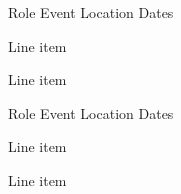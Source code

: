 

\begin{cventries}

  \cventry
    {Role} %
    {Event} %
    {Location} %
    {Dates} %
    {
      \begin{cvitems} %
        \item {Line item}
        \item {Line item}
      \end{cvitems}
    }

  \cventry
    {Role} %
    {Event} %
    {Location} %
    {Dates} %
    {
    \begin{cvitems} %
        \item {Line item}
        \item {Line item}
    \end{cvitems}
    }

\end{cventries}
